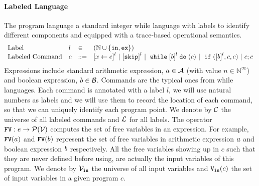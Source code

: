 \paragraph{Labeled Language}
The program language a standard integer while language with labels to identify different components and equipped with a  trace-based operational semantics.
\[
\begin{array}{llll}
%
\mbox{Label} 
& l & \in & (\mathbb{N} \cup \{\lin, \lex\}) 
\\ 
%
\mbox{Labeled Command} 
& {c} & ::= &  
\clabel{\assign{x}{\expr}}^l 
~|~  \clabel{\eskip}^l
~|~ \ewhile \clabel{\bexpr}^{l} \edo ({c})
~|~ \eif(\clabel{\bexpr}^{l} , {c}, {c}) 
~|~ {c};{c}  
\end{array}
\]
Expressions include
standard arithmetic expression, $a \in \mathcal{A}$ (with value $n \in \mathbb{N}^{\infty}$) and boolean expression, $b \in \mathcal{B}$.
Commands are the typical ones from while languages. Each command is annotated with a label $l$, we will use natural numbers as labels and we will use them to record
the location of each command, so that we can uniquely identify each program point.
We denote by $\mathcal{C}$ the universe of all labeled commands and $\mathcal{L}$ for all labels.
The operator $\mathtt{FV}: e \to \mathcal{P}(\mathcal{V})$ computes the set of free variables in an expression. For example,
$\mathtt{FV}(a)$ and $\mathtt{FV}(b)$ represent the set of free variables in arithmetic
expression $a$ and boolean expression $b$ respectively.
All the free variables
showing up in $c$ such that they are never defined before using, are actually the input variables of this program.
We denote by $\mathcal{V}_{\mathtt{in}}$ the universe of all input variables and $\mathtt{V_{\mathtt{in}}}(c)$ the set of input variables in a given program $c$.


